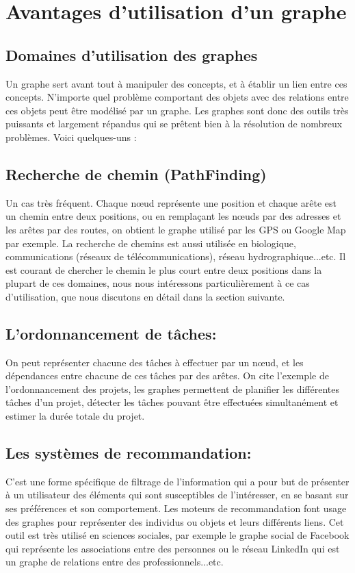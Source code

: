 	
	
\section{Avantages d'utilisation d'un graphe}
\subsection{Domaines d'utilisation des graphes}
Un graphe sert avant tout à manipuler des concepts, et à établir un lien entre ces concepts. N'importe quel problème comportant des objets avec des relations entre ces objets peut être modélisé par un graphe.
Les graphes sont donc des outils très puissants et largement répandus qui se prêtent bien à la résolution de nombreux problèmes. Voici quelques-uns :

\subsection{Recherche de chemin (PathFinding)}
Un cas très fréquent. Chaque nœud représente une position et chaque arête est un chemin entre deux positions, ou en remplaçant les nœuds par des adresses et les arêtes par des routes, on obtient le graphe utilisé par les GPS ou Google Map par exemple.
La recherche de chemins est aussi utilisée en biologique, communications (réseaux de télécommunications), réseau hydrographique...etc.
Il est courant de chercher le chemin le plus court entre deux positions dans la plupart de ces domaines, nous nous intéressons particulièrement à ce cas d'utilisation, que nous discutons en détail dans la section suivante.


\subsection{L'ordonnancement de tâches:}
On peut représenter chacune des tâches à effectuer par un nœud, et les dépendances entre chacune de ces tâches par des arêtes.
On cite l'exemple de l'ordonnancement des projets, les graphes permettent de planifier les différentes tâches d'un projet, détecter les tâches pouvant être effectuées simultanément et estimer la durée totale du projet.

\subsection{Les systèmes de recommandation:}
C'est une forme spécifique de filtrage de l'information qui a pour but de présenter à un utilisateur des éléments qui sont susceptibles de l'intéresser, en se basant sur ses préférences et son comportement.
Les moteurs de recommandation font usage des graphes pour représenter des individus ou objets et leurs différents liens. Cet outil est très utilisé en sciences sociales, par exemple le graphe social de Facebook qui représente les associations entre des personnes ou le réseau LinkedIn qui est un graphe de relations entre des professionnels...etc.

